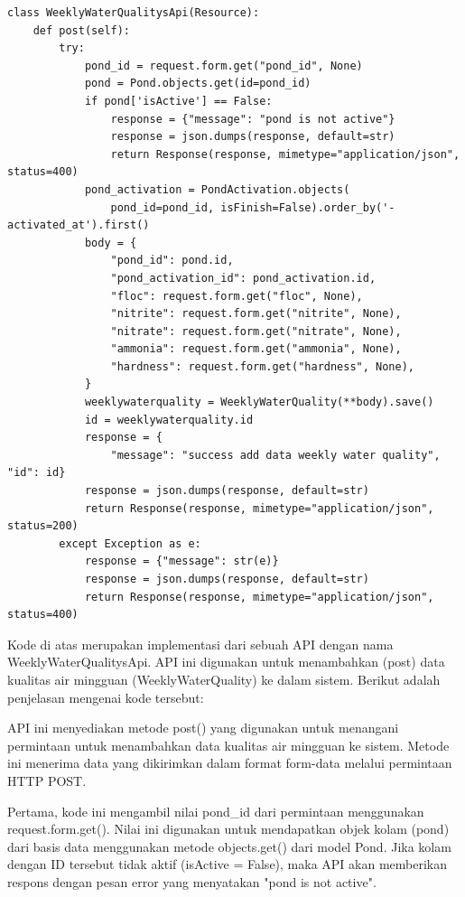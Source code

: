 \begin{enumerate}[1.]
\begin{lstlisting}
class WeeklyWaterQualitysApi(Resource):
    def post(self):
        try:
            pond_id = request.form.get("pond_id", None)
            pond = Pond.objects.get(id=pond_id)
            if pond['isActive'] == False:
                response = {"message": "pond is not active"}
                response = json.dumps(response, default=str)
                return Response(response, mimetype="application/json", status=400)
            pond_activation = PondActivation.objects(
                pond_id=pond_id, isFinish=False).order_by('-activated_at').first()
            body = {
                "pond_id": pond.id,
                "pond_activation_id": pond_activation.id,
                "floc": request.form.get("floc", None),
                "nitrite": request.form.get("nitrite", None),
                "nitrate": request.form.get("nitrate", None),
                "ammonia": request.form.get("ammonia", None),
                "hardness": request.form.get("hardness", None),
            }
            weeklywaterquality = WeeklyWaterQuality(**body).save()
            id = weeklywaterquality.id
            response = {
                "message": "success add data weekly water quality", "id": id}
            response = json.dumps(response, default=str)
            return Response(response, mimetype="application/json", status=200)
        except Exception as e:
            response = {"message": str(e)}
            response = json.dumps(response, default=str)
            return Response(response, mimetype="application/json", status=400)
\end{lstlisting}


Kode di atas merupakan implementasi dari sebuah API dengan nama WeeklyWaterQualitysApi. API ini digunakan untuk menambahkan (post) data kualitas air mingguan (WeeklyWaterQuality) ke dalam sistem. Berikut adalah penjelasan mengenai kode tersebut:

API ini menyediakan metode post() yang digunakan untuk menangani permintaan untuk menambahkan data kualitas air mingguan ke sistem. Metode ini menerima data yang dikirimkan dalam format form-data melalui permintaan HTTP POST.

Pertama, kode ini mengambil nilai pond\_id dari permintaan menggunakan request.form.get(). Nilai ini digunakan untuk mendapatkan objek kolam (pond) dari basis data menggunakan metode objects.get() dari model Pond. Jika kolam dengan ID tersebut tidak aktif (isActive = False), maka API akan memberikan respons dengan pesan error yang menyatakan "pond is not active".


\end{enumerate}
